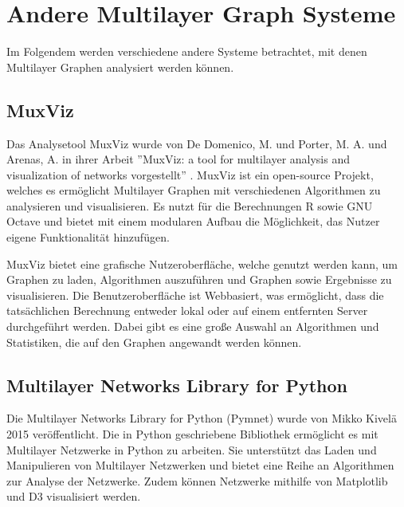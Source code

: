 \section{Andere Multilayer Graph Systeme}

Im Folgendem werden verschiedene andere Systeme betrachtet, mit denen Multilayer Graphen analysiert werden können.

\subsection{MuxViz}

Das Analysetool MuxViz wurde von De Domenico, M. und Porter, M. A. und Arenas, A. in ihrer Arbeit ''MuxViz: a tool for multilayer analysis and visualization of networks vorgestellt'' \cite{De_Domenico_2014}.
MuxViz ist ein open-source Projekt, welches es ermöglicht Multilayer Graphen mit verschiedenen Algorithmen zu analysieren und visualisieren. Es nutzt für die Berechnungen R sowie GNU Octave und bietet mit einem modularen Aufbau die Möglichkeit, das Nutzer eigene Funktionalität hinzufügen.


MuxViz bietet eine grafische Nutzeroberfläche, welche genutzt werden kann, um Graphen zu laden, Algorithmen auszuführen und Graphen sowie Ergebnisse zu visualisieren. Die Benutzeroberfläche ist Webbasiert, was ermöglicht, dass die tatsächlichen Berechnung entweder lokal oder auf einem entfernten Server durchgeführt werden.
Dabei gibt es eine große Auswahl an Algorithmen und Statistiken, die auf den Graphen angewandt werden können.



\subsection{Multilayer Networks Library for Python}

Die Multilayer Networks Library for Python (Pymnet) wurde von Mikko Kivelä 2015 veröffentlicht. 
Die in Python geschriebene Bibliothek ermöglicht es mit Multilayer Netzwerke in Python zu arbeiten. Sie unterstützt das Laden und Manipulieren von Multilayer Netzwerken und bietet eine Reihe an Algorithmen zur Analyse der Netzwerke.
Zudem können Netzwerke mithilfe von Matplotlib und D3 visualisiert werden.
